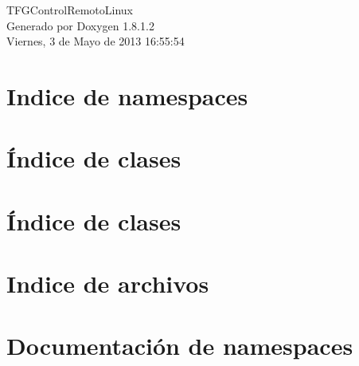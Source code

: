 \documentclass{book}
\begin{document}
\hypersetup{pageanchor=false,citecolor=blue}
\begin{titlepage}
\vspace*{7cm}
\begin{center}
{\Large T\-F\-G\-Control\-Remoto\-Linux }\\
\vspace*{1cm}
{\large Generado por Doxygen 1.8.1.2}\\
\vspace*{0.5cm}
{\small Viernes, 3 de Mayo de 2013 16:55:54}\\
\end{center}
\end{titlepage}
\clearemptydoublepage
{}
\tableofcontents
\clearemptydoublepage
{}
\hypersetup{pageanchor=true,citecolor=blue}
\chapter{Indice de namespaces}

\chapter{Índice de clases}

\chapter{Índice de clases}

\chapter{Indice de archivos}

\chapter{Documentación de namespaces}










\end{document}
